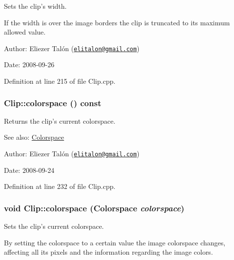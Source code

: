 Sets the clip's width. 

If the width is over the image borders the clip is truncated to its maximum allowed value.

\begin{Desc}
\item[Author:]Eliezer Talón (\href{mailto:elitalon@gmail.com}{\tt elitalon@gmail.com}) \end{Desc}
\begin{Desc}
\item[Date:]2008-09-26 \end{Desc}


Definition at line 215 of file Clip.cpp.\hypertarget{class_clip_e22de9122a399af67576eb114842846a}{
\subsubsection[colorspace]{ Clip::colorspace () const}}
\label{class_clip_e22de9122a399af67576eb114842846a}


Returns the clip's current colorspace. 

\begin{Desc}
\item[See also:]\hyperlink{_colorspace_8h_7a7e24cdb2a27271343f0adceff89f65}{Colorspace}\end{Desc}
\begin{Desc}
\item[Author:]Eliezer Talón (\href{mailto:elitalon@gmail.com}{\tt elitalon@gmail.com}) \end{Desc}
\begin{Desc}
\item[Date:]2008-09-24 \end{Desc}


Definition at line 232 of file Clip.cpp.\hypertarget{class_clip_7e7fa163b90c573adc424e022235c539}{
\subsubsection[colorspace]{\setlength{\rightskip}{0pt plus 5cm}void Clip::colorspace ({\bf Colorspace} {\em colorspace})}}
\label{class_clip_7e7fa163b90c573adc424e022235c539}


Sets the clip's current colorspace. 

By setting the colorspace to a certain value the image colorspace changes, affecting all its pixels and the information regarding the image colors.

